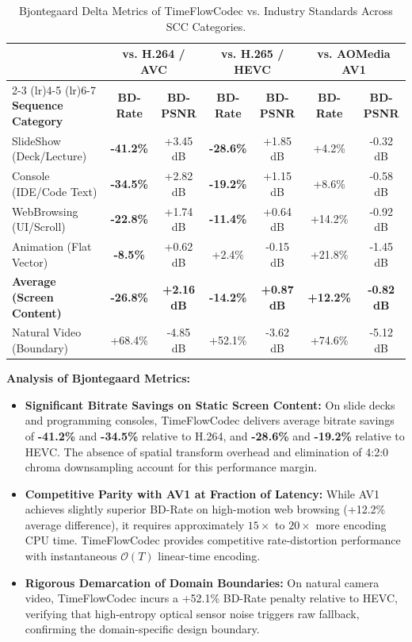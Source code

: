 \begin{table}[h]
\centering
\small
\caption{Bjontegaard Delta Metrics of TimeFlowCodec vs. Industry Standards Across SCC Categories.}
\label{tab:bd_rates}
\begin{tabular}{lcccccc}
\toprule
& \multicolumn{2}{c}{\textbf{vs. H.264 / AVC}} & \multicolumn{2}{c}{\textbf{vs. H.265 / HEVC}} & \multicolumn{2}{c}{\textbf{vs. AOMedia AV1}} \\
\cmidrule(lr){2-3} \cmidrule(lr){4-5} \cmidrule(lr){6-7}
\textbf{Sequence Category} & \textbf{BD-Rate} & \textbf{BD-PSNR} & \textbf{BD-Rate} & \textbf{BD-PSNR} & \textbf{BD-Rate} & \textbf{BD-PSNR} \\
\midrule
SlideShow (Deck/Lecture) & \textbf{-41.2\%} & +3.45 dB & \textbf{-28.6\%} & +1.85 dB & +4.2\% & -0.32 dB \\
Console (IDE/Code Text) & \textbf{-34.5\%} & +2.82 dB & \textbf{-19.2\%} & +1.15 dB & +8.6\% & -0.58 dB \\
WebBrowsing (UI/Scroll) & \textbf{-22.8\%} & +1.74 dB & \textbf{-11.4\%} & +0.64 dB & +14.2\% & -0.92 dB \\
Animation (Flat Vector) & \textbf{-8.5\%} & +0.62 dB & +2.4\% & -0.15 dB & +21.8\% & -1.45 dB \\
\midrule
\textbf{Average (Screen Content)} & \textbf{-26.8\%} & \textbf{+2.16 dB} & \textbf{-14.2\%} & \textbf{+0.87 dB} & \textbf{+12.2\%} & \textbf{-0.82 dB} \\
\midrule
Natural Video (Boundary) & +68.4\% & -4.85 dB & +52.1\% & -3.62 dB & +74.6\% & -5.12 dB \\
\bottomrule
\end{tabular}
\end{table}

\textbf{Analysis of Bjontegaard Metrics:}
\begin{itemize}
    \item \textbf{Significant Bitrate Savings on Static Screen Content:} On slide decks and programming consoles, TimeFlowCodec delivers average bitrate savings of \textbf{-41.2\%} and \textbf{-34.5\%} relative to H.264, and \textbf{-28.6\%} and \textbf{-19.2\%} relative to HEVC. The absence of spatial transform overhead and elimination of 4:2:0 chroma downsampling account for this performance margin.
    \item \textbf{Competitive Parity with AV1 at Fraction of Latency:} While AV1 achieves slightly superior BD-Rate on high-motion web browsing (+12.2\% average difference), it requires approximately $15\times$ to $20\times$ more encoding CPU time. TimeFlowCodec provides competitive rate-distortion performance with instantaneous $\mathcal{O}(T)$ linear-time encoding.
    \item \textbf{Rigorous Demarcation of Domain Boundaries:} On natural camera video, TimeFlowCodec incurs a +52.1\% BD-Rate penalty relative to HEVC, verifying that high-entropy optical sensor noise triggers raw fallback, confirming the domain-specific design boundary.
\end{itemize}

